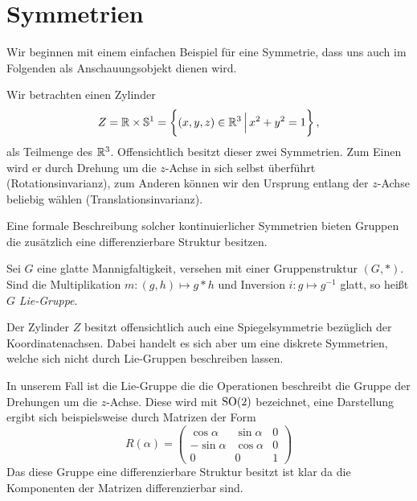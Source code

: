 \section{Symmetrien}
Wir beginnen mit einem einfachen Beispiel für eine Symmetrie, dass uns auch im
Folgenden als Anschauungsobjekt dienen wird.
\begin{beispiel}
Wir betrachten einen Zylinder
\begin{equation}
Z=\Reals\times\Sphere^1=\left\{(x,y,z)\in\Reals^3\,\Big|\,x^2+y^2=1\right\}\,,
\end{equation}
als Teilmenge des $\mathbb{R}^3$.
Offensichtlich besitzt dieser zwei Symmetrien. Zum Einen wird er durch
Drehung um die $z$-Achse in sich selbst überführt (Rotationsinvarianz), zum
Anderen können wir den Ursprung entlang der $z$-Achse beliebig wählen
(Translationsinvarianz).
\end{beispiel}
Eine formale Beschreibung solcher kontinuierlicher Symmetrien bieten 
Gruppen die zusätzlich eine differenzierbare Struktur besitzen.
\begin{definition}
Sei $G$ eine glatte Mannigfaltigkeit, versehen mit einer Gruppenstruktur
$(G,*)$.
Sind die Multiplikation $m:(g,h)\mapsto g* h$ und Inversion $i:g\mapsto g^{-1}$
glatt, so heißt $G$ \emph{Lie-Gruppe}.
\end{definition}
\begin{bemerkung}
Der Zylinder $Z$ besitzt offensichtlich auch eine Spiegelsymmetrie bezüglich der
Koordinatenachsen. Dabei
handelt es sich aber um eine diskrete Symmetrien, welche sich nicht durch Lie-Gruppen beschreiben lassen.
\end{bemerkung}
\begin{beispiel}[$\SpOr(n)$]%
\end{beispiel}
In unserem Fall ist die Lie-Gruppe die die Operationen beschreibt die Gruppe der
Drehungen um die $z$-Achse. Diese wird mit $\operatorname{SO}(2)$ bezeichnet, eine
Darstellung ergibt sich beispielsweise durch Matrizen der Form
\begin{equation}
R(\alpha)=
\begin{pmatrix}
\cos\alpha&\sin\alpha&0\\
-\sin\alpha&\cos\alpha&0\\
0&0&1
\end{pmatrix}
\end{equation}
Das diese Gruppe eine differenzierbare Struktur besitzt ist klar da die
Komponenten der Matrizen differenzierbar sind.
